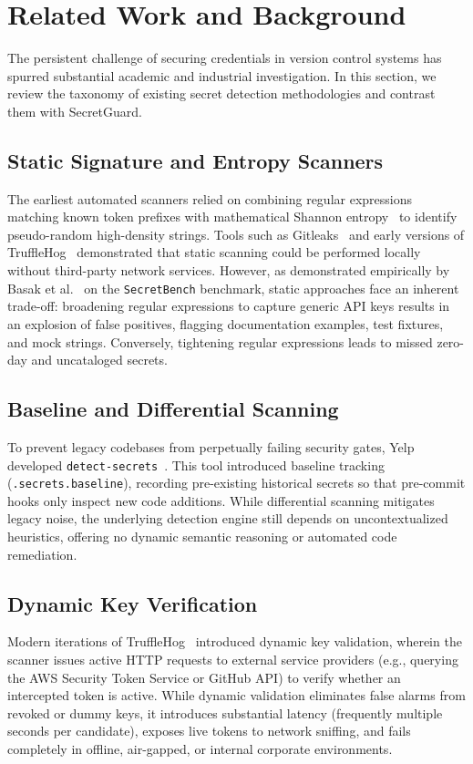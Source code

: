 \section{Related Work and Background}
\label{sec:related_work}

The persistent challenge of securing credentials in version control systems has spurred substantial academic and industrial investigation. In this section, we review the taxonomy of existing secret detection methodologies and contrast them with SecretGuard.

\subsection{Static Signature and Entropy Scanners}
The earliest automated scanners relied on combining regular expressions matching known token prefixes with mathematical Shannon entropy~\cite{shannon1948mathematical} to identify pseudo-random high-density strings. Tools such as Gitleaks~\cite{rice2018gitleaks} and early versions of TruffleHog~\cite{ayrey2016trufflehog} demonstrated that static scanning could be performed locally without third-party network services. However, as demonstrated empirically by Basak et al.~\cite{basak2023comparative} on the \texttt{SecretBench} benchmark, static approaches face an inherent trade-off: broadening regular expressions to capture generic API keys results in an explosion of false positives, flagging documentation examples, test fixtures, and mock strings. Conversely, tightening regular expressions leads to missed zero-day and uncataloged secrets.

\subsection{Baseline and Differential Scanning}
To prevent legacy codebases from perpetually failing security gates, Yelp developed \texttt{detect-secrets}~\cite{yelp2019detectsecrets}. This tool introduced baseline tracking (\texttt{.secrets.baseline}), recording pre-existing historical secrets so that pre-commit hooks only inspect new code additions. While differential scanning mitigates legacy noise, the underlying detection engine still depends on uncontextualized heuristics, offering no dynamic semantic reasoning or automated code remediation.

\subsection{Dynamic Key Verification}
Modern iterations of TruffleHog~\cite{ayrey2016trufflehog} introduced dynamic key validation, wherein the scanner issues active HTTP requests to external service providers (e.g., querying the AWS Security Token Service or GitHub API) to verify whether an intercepted token is active. While dynamic validation eliminates false alarms from revoked or dummy keys, it introduces substantial latency (frequently multiple seconds per candidate), exposes live tokens to network sniffing, and fails completely in offline, air-gapped, or internal corporate environments.

